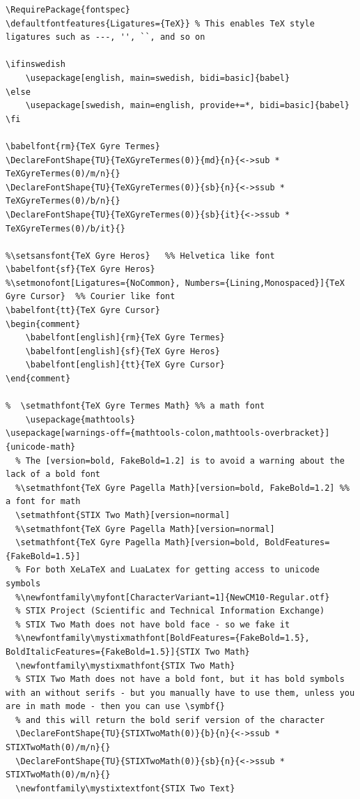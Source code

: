 \documentclass[12pt, twoside]{article}
\newif\ifinswedish
\begin{document}
\begin{lstlisting}[style=latexExampleForAuthors, caption={The main fonts used in the template in addition to Figtree}, label=lst:FontsUsed]
\RequirePackage{fontspec}
\defaultfontfeatures{Ligatures={TeX}} % This enables TeX style ligatures such as ---, '', ``, and so on

\ifinswedish
    \usepackage[english, main=swedish, bidi=basic]{babel}
\else
    \usepackage[swedish, main=english, provide+=*, bidi=basic]{babel}
\fi

\babelfont{rm}{TeX Gyre Termes}
\DeclareFontShape{TU}{TeXGyreTermes(0)}{md}{n}{<->sub * TeXGyreTermes(0)/m/n}{}
\DeclareFontShape{TU}{TeXGyreTermes(0)}{sb}{n}{<->ssub * TeXGyreTermes(0)/b/n}{}
\DeclareFontShape{TU}{TeXGyreTermes(0)}{sb}{it}{<->ssub * TeXGyreTermes(0)/b/it}{}
  
%\setsansfont{TeX Gyre Heros}   %% Helvetica like font
\babelfont{sf}{TeX Gyre Heros}
%\setmonofont[Ligatures={NoCommon}, Numbers={Lining,Monospaced}]{TeX Gyre Cursor}  %% Courier like font
\babelfont{tt}{TeX Gyre Cursor}
\begin{comment}
    \babelfont[english]{rm}{TeX Gyre Termes}
    \babelfont[english]{sf}{TeX Gyre Heros}
    \babelfont[english]{tt}{TeX Gyre Cursor}
\end{comment}

%  \setmathfont{TeX Gyre Termes Math} %% a math font
    \usepackage{mathtools}
\usepackage[warnings-off={mathtools-colon,mathtools-overbracket}]{unicode-math}
  % The [version=bold, FakeBold=1.2] is to avoid a warning about the lack of a bold font
  %\setmathfont{TeX Gyre Pagella Math}[version=bold, FakeBold=1.2] %% a font for math
  \setmathfont{STIX Two Math}[version=normal]
  %\setmathfont{TeX Gyre Pagella Math}[version=normal]
  \setmathfont{TeX Gyre Pagella Math}[version=bold, BoldFeatures={FakeBold=1.5}]
  % For both XeLaTeX and LuaLatex for getting access to unicode symbols
  %\newfontfamily\myfont[CharacterVariant=1]{NewCM10-Regular.otf}
  % STIX Project (Scientific and Technical Information Exchange)
  % STIX Two Math does not have bold face - so we fake it
  %\newfontfamily\mystixmathfont[BoldFeatures={FakeBold=1.5}, BoldItalicFeatures={FakeBold=1.5}]{STIX Two Math}
  \newfontfamily\mystixmathfont{STIX Two Math}
  % STIX Two Math does not have a bold font, but it has bold symbols with an without serifs - but you manually have to use them, unless you are in math mode - then you can use \symbf{}
  % and this will return the bold serif version of the character
  \DeclareFontShape{TU}{STIXTwoMath(0)}{b}{n}{<->ssub * STIXTwoMath(0)/m/n}{}
  \DeclareFontShape{TU}{STIXTwoMath(0)}{sb}{n}{<->ssub * STIXTwoMath(0)/m/n}{}
  \newfontfamily\mystixtextfont{STIX Two Text}


\end{lstlisting}
\end{document}
